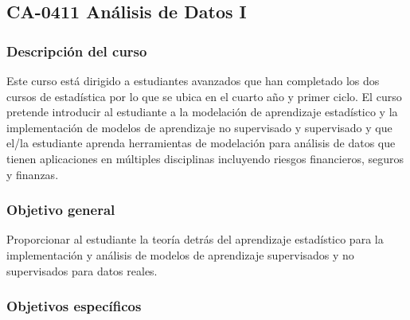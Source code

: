\newpage
\subsection*{CA-0411 Análisis de Datos I}

\hypertarget{MA0711AnalisisDatos}{}
\begin{refsection}
\begin{table}[H]
\end{table}

\subsubsection*{Descripción del curso}

Este curso está dirigido a estudiantes avanzados que han completado los dos cursos de estadística por lo que se ubica en el cuarto año y primer ciclo. El curso pretende introducir al estudiante a la modelación de aprendizaje estadístico y la implementación de modelos de aprendizaje no supervisado y supervisado y que el/la estudiante aprenda herramientas de modelación para análisis de datos que tienen aplicaciones en múltiples disciplinas incluyendo riesgos financieros, seguros y finanzas.

\subsubsection*{Objetivo general}

Proporcionar al estudiante la teoría detrás del aprendizaje estadístico para la implementación y análisis de modelos de aprendizaje supervisados y no supervisados para datos reales.

\subsubsection*{Objetivos específicos}


\end{refsection}

